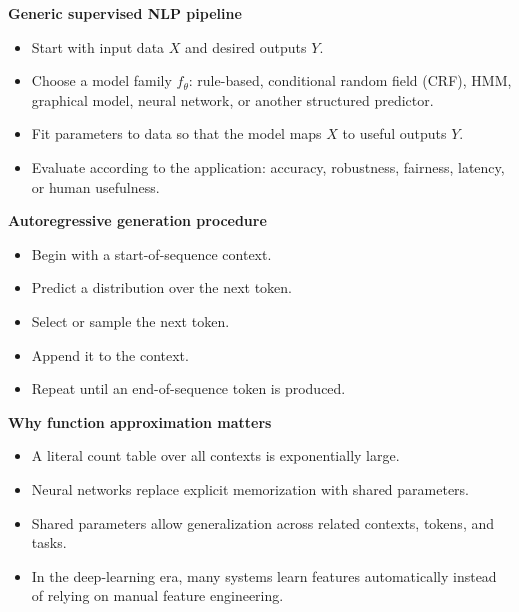 \documentclass[11pt]{article}
\begin{document}
\textbf{Generic supervised NLP pipeline}
\begin{itemize}
    \item Start with input data \(X\) and desired outputs \(Y\).
    \item Choose a model family \(f_\theta\): rule-based, conditional random field (CRF), HMM, graphical model, neural network, or another structured predictor.
    \item Fit parameters to data so that the model maps \(X\) to useful outputs \(Y\).
    \item Evaluate according to the application: accuracy, robustness, fairness, latency, or human usefulness.
\end{itemize}

\textbf{Autoregressive generation procedure}
\begin{itemize}
    \item Begin with a start-of-sequence context.
    \item Predict a distribution over the next token.
    \item Select or sample the next token.
    \item Append it to the context.
    \item Repeat until an end-of-sequence token is produced.
\end{itemize}

\textbf{Why function approximation matters}
\begin{itemize}
    \item A literal count table over all contexts is exponentially large.
    \item Neural networks replace explicit memorization with shared parameters.
    \item Shared parameters allow generalization across related contexts, tokens, and tasks.
    \item In the deep-learning era, many systems learn features automatically instead of relying on manual feature engineering.
\end{itemize}
\end{document}
